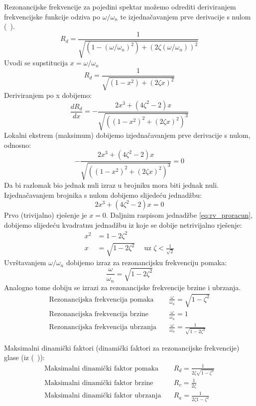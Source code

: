 Rezonancijske frekvencije za pojedini spektar možemo odrediti deriviranjem frekvencijske 
funkcije odziva po $\omega/\omega_n$ te izjednačavanjem prve derivacije s
nulom (~\cite{chopra2011}).
\[
    R_d = \frac{1}{\sqrt{(1-(\omega/\omega_n)^2) + (2\zeta(\omega/\omega_n))^2}}
\]
Uvodi se supstitucija $x=\omega/\omega_n$
\[
    R_d = \frac{1}{\sqrt{(1-x^2)+(2\zeta x)^2}}
\]
Deriviranjem po x dobijemo:
\[
    \frac{dR_d}{dx}=-\frac{2x^3+(4\zeta^2-2)x}{\sqrt{((1-x^2)^2+(2\zeta x)^2)^3}}
\]
Lokalni ekstrem (maksimum) dobijemo izjednačavanjem prve derivacije s nulom,
odnosno:
\[
    -\frac{2x^3+(4\zeta^2-2)x}{\sqrt{((1-x^2)^2+(2\zeta x)^2)^3}} = 0
\]
Da bi razlomak bio jednak nuli izraz u brojniku mora biti jednak nuli.
Izjednačavanjem brojnika s nulom dobijemo slijedeću jednadžbu:
\begin{equation}\label{eq:rv_proracun}
    2x^3 + (4\zeta^2 -2)x = 0
\end{equation}
Prvo (trivijalno) rješenje je $x=0$. Daljnim raspisom jednadžbe \eqref{eq:rv_proracun},
dobijemo slijedeću kvadratnu jednadžbu iz koje se dobije netrivijalno rješenje:
\[
    \begin{aligned}
        x^2 &= 1-2\zeta^2\\
        x &= \sqrt{1-2\zeta^2} \quad \text{ uz } \zeta < \frac{1}{\sqrt{2}}
    \end{aligned}
\]
Uvrštavanjem $\omega/\omega_n$ dobijemo izraz za rezonancijsku frekvenciju pomaka:
\begin{equation}\label{eq:rezonantna_frekvencija_pomak}
    \frac{\omega}{\omega_n}=\sqrt{1-2\zeta^2}
\end{equation}
Analogno tome dobiju se izrazi za rezonancijske frekvencije brzine i ubrzanja.
\begin{align}
    \text{Rezonancijska frekvencija pomaka}\quad & \frac{\omega}{\omega_n} = \sqrt{1-\zeta^2}\label{eq:rd_rezonanca}\\
    \text{Rezonancijska frekvencija brzine}\quad & \frac{\omega}{\omega_n} = 1 \label{eq:rv_rezonanca}\\
    \text{Rezonancijska frekvencija ubrzanja}\quad & \frac{\omega}{\omega_n} = \frac{1}{\sqrt{1-2\zeta^2}}\label{eq:ra_rezonanca}
\end{align}

Maksimalni dinamički faktori (dinamički faktori za rezonancijske frekvencije) glase
(iz (~\cite{chopra2011})):
\begin{align}
    \text{Maksimalni dinamički faktor pomaka}\quad & R_d = \frac{1}{2\zeta\sqrt{1-\zeta^2}}\\
    \text{Maksimalni dinamički faktor brzine}\quad & R_v = \frac{1}{2\zeta}\\
    \text{Maksimalni dinamički faktor ubrzanja}\quad & R_a = \frac{1}{2\zeta{1-\zeta^2}}
\end{align}


